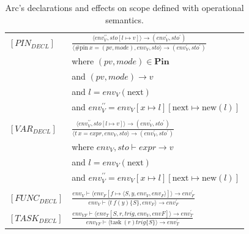 \begin{table}[htb!]
    \small
    \centering
    \begin{tabular}{ll}
        \toprule
        $[PIN_{DECL}]$  & $\frac
            {\langle env^{\prime\prime}_V, sto[l \mapsto v] \rangle \rightarrow (env^\prime_V, sto^\prime)}
            {\langle \text{\#pin} \ x = (pv, mode), env_V, sto\rangle\rightarrow (env^\prime_V, sto^\prime)}$ \\ [12pt]
                        & where $(pv, mode) \in \textbf{Pin} $                                                \\
                        & and $(pv,mode) \rightarrow v $                                                      \\
                        & and $l = env_V(\text{next})$                                                        \\
                        & and $env^{\prime\prime}_V = env_V[x \mapsto l][\text{next} \mapsto \text{new}(l)] $ \\
        \\

        $[VAR_{DECL}]$  & $\frac
            {\langle env^{\prime\prime}_V, sto[l \mapsto v] \rangle \rightarrow (env^\prime_V, sto^\prime)}
            {\langle t \ x = expr, env_V, sto\rangle\rightarrow (env^\prime_V, sto^\prime)}$                  \\ [12pt]
                        & where $env_V, sto \vdash expr \rightarrow v $                                       \\
                        & and $l = env_V(\text{next})$                                                        \\
                        & and $env^{\prime\prime}_V = env_V[x \mapsto l][\text{next} \mapsto \text{new}(l)] $ \\
        \\

        $[FUNC_{DECL}]$ & $\frac
            {env_V \vdash \langle env_F[f \mapsto \langle S, y, env_V, env_F\rangle] \rangle \rightarrow env^\prime_F}
            {env_V \vdash \langle t \ f (y) \{S \}, env_F \rangle \rightarrow env^\prime_F}$                  \\ [12pt]

        $[TASK_{DECL}]$ & $\frac
            {env_{VF}\vdash \langle env_T[S, r, trig, env_V, envF] \rangle \rightarrow env^\prime_T}
            {env_{VF}\vdash \langle \text{task} \ (r) trig \{S\} \rangle \rightarrow env^\prime_T}$           \\
        \bottomrule
    \end{tabular}
    \caption{Arc's declarations and effects on scope defined with operational semantics.}
    \label{tab:arcscoperules}
\end{table}


